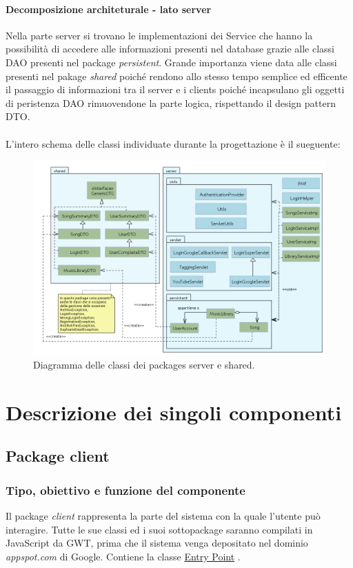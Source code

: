 \subsubsection{Decomposizione architeturale - lato server}
Nella parte server si trovano le implementazioni dei Service che hanno
la possibilit\`a di accedere alle informazioni presenti nel database grazie alle
classi DAO presenti nel package \emph{persistent}.
Grande importanza viene data alle classi presenti nel pakage \emph{shared}
poich\'e rendono allo stesso tempo semplice ed efficente il passaggio di
informazioni tra il server e i clients poich\'e incapsulano gli oggetti di
peristenza DAO rimuovendone la parte logica, rispettando il design pattern DTO.
\\\\ L'intero schema delle classi
individuate durante la progettazione \`e il sueguente: \begin{figure}[h]
  \centering
  \includegraphics[width=16.5cm]{img/ST/Server&Shared.png}
\caption{Diagramma delle classi dei packages server e shared.}
\end{figure}


\chapter{Descrizione dei singoli componenti}
\section{Package client}
\subsection*{Tipo, obiettivo e funzione del componente} %
Il package \emph{client} rappresenta la parte del sistema con la quale l'utente
pu\`o interagire. Tutte le sue classi ed i suoi sottopackage saranno compilati in
JavaScript da GWT, prima che il sistema venga depositato nel dominio
\emph{appspot.com} di Google. Contiene la classe \underline{Entry Point}
.

